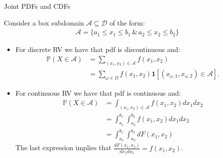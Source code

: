 \documentclass[9pt]{beamer}
\begin{document}
%
\begin{frame}{Joint PDFs and CDFs}

Consider a box subdomain $\mathcal{A}\subseteq\mathcal{D}$ of the form:
\begin{align*}
\mathcal{A}=\{a_1 \leq x_1\leq b_1 \, \&\, a_2 \leq x_2\leq b_2\}
\end{align*}

\begin{itemize}

\item For discrete RV we have that pdf is discontinuous and:
\begin{align*}
\mathbb{P}(X\in \mathcal{A})&=\sum_{(x_1,x_2)\in \mathcal{A}}f(x_1,x_2)\\
&=\sum_{\omega \in \Omega}f(x_1,x_2)\mathbf{1}[(x_{\omega,1},x_{\omega,2})\in \mathcal{A}].
\end{align*}

\item For continuous RV we have that pdf is continuous and:
\begin{align*}
\mathbb{P}(X\in \mathcal{A})&=\int_{(x_1,x_2)\in \mathcal{A}}f(x_1,x_2)dx_1dx_2\\
&=\int_{a_1}^{b_1}\int_{a_2}^{b_2}f(x_1,x_2)dx_1dx_2\\
&=\int_{a_1}^{b_1}\int_{a_2}^{b_2}dF(x_1,x_2)
\end{align*}
The last expression implies that $\frac{dF(x_1,x_2)}{dx_1dx_2}=f(x_1,x_2)$.

\end{itemize}

\end{frame}
\end{document}
